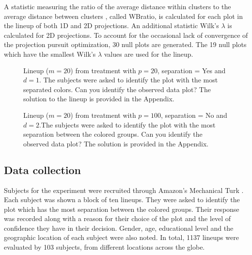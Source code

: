 A statistic measuring the ratio of the average distance within clusters to the average distance between clusters \citep{hennig:2010}, called WBratio, is calculated for each plot in the lineup of both 1D and 2D projections. An additional statistic Wilk's $\lambda$ \citep[e.g.][]{JW02} is calculated for 2D projections. To account for the occasional lack of convergence of the projection pursuit optimization, 30 null plots are generated. The 19 null plots which have the smallest Wilk's $\lambda$ values are used for the lineup. 

\begin{figure}[hbtp]
   \centering
       \caption{Lineup  ($m=20$) from treatment with $p = 20$, separation = Yes and $d = 1$. The subjects were asked to identify the plot with the most separated colors. Can you identify the observed data plot? The solution to the lineup is provided in the Appendix. }
     \label{fig:test_category_1d}
\end{figure}


 
\begin{figure}[hbtp]
       \caption{Lineup  ($m=20$) from treatment with $p = 100$, separation = No and $d = 2$.The subjects were asked to identify the plot with the most separation between the colored groups. Can you identify the observed data plot? The solution is provided in the Appendix. }
       \label{fig:test_category}
\end{figure}


\subsection{Data collection}

Subjects  for the experiment were recruited through Amazon's Mechanical Turk  \citep{turk}. 
Each subject was shown a block of ten lineups. They were asked to identify the plot which has the most separation between the colored groups. Their response was recorded along with a reason for their choice of the plot and the level of confidence they have in their decision.  Gender, age, educational level and the geographic location of each subject were also noted. In total, 1137 lineups were evaluated by 103 subjects, from different locations across the globe. 

